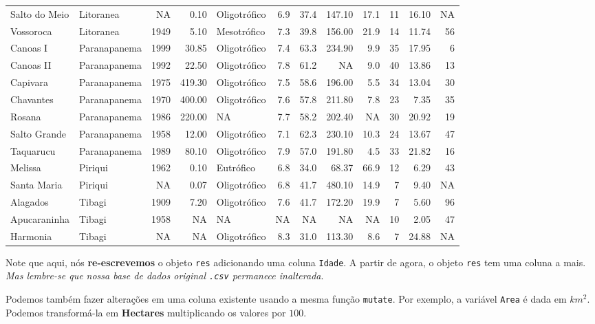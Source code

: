 \documentclass[
]{book}
\begin{document}
\begin{table}
\begin{tabular}{llrrlrrrrrrr}
Salto do Meio & Litoranea & NA & 0.10 & Oligotrófico & 6.9 & 37.4 & 147.10 & 17.1 & 11 & 16.10 & NA\\
Vossoroca & Litoranea & 1949 & 5.10 & Mesotrófico & 7.3 & 39.8 & 156.00 & 21.9 & 14 & 11.74 & 56\\
Canoas I & Paranapanema & 1999 & 30.85 & Oligotrófico & 7.4 & 63.3 & 234.90 & 9.9 & 35 & 17.95 & 6\\
\addlinespace
Canoas II & Paranapanema & 1992 & 22.50 & Oligotrófico & 7.8 & 61.2 & NA & 9.0 & 40 & 13.86 & 13\\
Capivara & Paranapanema & 1975 & 419.30 & Oligotrófico & 7.5 & 58.6 & 196.00 & 5.5 & 34 & 13.04 & 30\\
Chavantes & Paranapanema & 1970 & 400.00 & Oligotrófico & 7.6 & 57.8 & 211.80 & 7.8 & 23 & 7.35 & 35\\
Rosana & Paranapanema & 1986 & 220.00 & NA & 7.7 & 58.2 & 202.40 & NA & 30 & 20.92 & 19\\
Salto Grande & Paranapanema & 1958 & 12.00 & Oligotrófico & 7.1 & 62.3 & 230.10 & 10.3 & 24 & 13.67 & 47\\
\addlinespace
Taquarucu & Paranapanema & 1989 & 80.10 & Oligotrófico & 7.9 & 57.0 & 191.80 & 4.5 & 33 & 21.82 & 16\\
Melissa & Piriqui & 1962 & 0.10 & Eutrófico & 6.8 & 34.0 & 68.37 & 66.9 & 12 & 6.29 & 43\\
Santa Maria & Piriqui & NA & 0.07 & Oligotrófico & 6.8 & 41.7 & 480.10 & 14.9 & 7 & 9.40 & NA\\
Alagados & Tibagi & 1909 & 7.20 & Oligotrófico & 7.6 & 41.7 & 172.20 & 19.9 & 7 & 5.60 & 96\\
Apucaraninha & Tibagi & 1958 & NA & NA & NA & NA & NA & NA & 10 & 2.05 & 47\\
\addlinespace
Harmonia & Tibagi & NA & NA & Oligotrófico & 8.3 & 31.0 & 113.30 & 8.6 & 7 & 24.88 & NA\\
\bottomrule
\end{tabular}
\endgroup{}
\end{table}

Note que aqui, nós \textbf{re-escrevemos} o objeto \texttt{res} adicionando uma coluna \texttt{Idade}. A partir de agora, o objeto \texttt{res} tem uma coluna a mais. \emph{Mas lembre-se que nossa base de dados original \texttt{.csv} permanece inalterada}.

Podemos também fazer alterações em uma coluna existente usando a mesma função \texttt{mutate}. Por exemplo, a variável \texttt{Area} é dada em \(km^2\). Podemos transformá-la em \textbf{Hectares} multiplicando os valores por \(100\).
\end{document}
